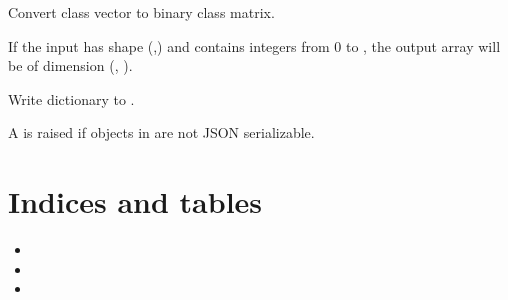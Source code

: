\documentclass[letterpaper,10pt,english]{sphinxmanual}
\begin{document}

\begin{fulllineitems}
\label{snntoolbox.io_utils:snntoolbox.io_utils.common.to_categorical}
Convert class vector to binary class matrix.

If the input  has shape (,) and contains integers from 0
to , the output array will be of dimension
(, ).

\end{fulllineitems}


\begin{fulllineitems}
\label{snntoolbox.io_utils:snntoolbox.io_utils.common.to_json}
Write  dictionary to .

A  is raised if objects in  are not JSON serializable.

\end{fulllineitems}



\chapter{Indices and tables}
\label{index:indices-and-tables}\begin{itemize}
\item {} 

\item {} 

\item {} 

\end{itemize}
\end{document}
